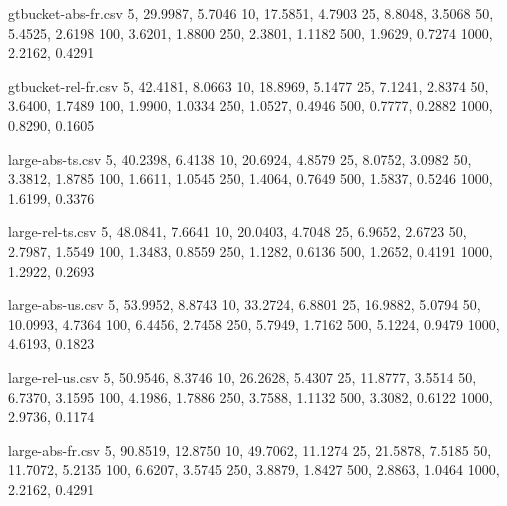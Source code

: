\begin{filecontents*}[overwrite]{gtbucket-abs-fr.csv}
5,    29.9987, 5.7046
10,   17.5851, 4.7903
25,    8.8048, 3.5068
50,    5.4525, 2.6198
100,   3.6201, 1.8800
250,   2.3801, 1.1182
500,   1.9629, 0.7274
1000,  2.2162, 0.4291
\end{filecontents*}

\begin{filecontents*}[overwrite]{gtbucket-rel-fr.csv}
5,    42.4181, 8.0663
10,   18.8969, 5.1477
25,    7.1241, 2.8374
50,    3.6400, 1.7489
100,   1.9900, 1.0334
250,   1.0527, 0.4946
500,   0.7777, 0.2882
1000,  0.8290, 0.1605
\end{filecontents*}


\begin{filecontents*}[overwrite]{large-abs-ts.csv}
5,    40.2398, 6.4138
10,   20.6924, 4.8579
25,    8.0752, 3.0982
50,    3.3812, 1.8785
100,   1.6611, 1.0545
250,   1.4064, 0.7649
500,   1.5837, 0.5246
1000,  1.6199, 0.3376
\end{filecontents*}

\begin{filecontents*}[overwrite]{large-rel-ts.csv}
5,    48.0841, 7.6641
10,   20.0403, 4.7048
25,    6.9652, 2.6723
50,    2.7987, 1.5549
100,   1.3483, 0.8559
250,   1.1282, 0.6136
500,   1.2652, 0.4191
1000,  1.2922, 0.2693
\end{filecontents*}

\begin{filecontents*}[overwrite]{large-abs-us.csv}
5,    53.9952, 8.8743
10,   33.2724, 6.8801
25,   16.9882, 5.0794
50,   10.0993, 4.7364
100,   6.4456, 2.7458
250,   5.7949, 1.7162
500,   5.1224, 0.9479
1000,  4.6193, 0.1823
\end{filecontents*}

\begin{filecontents*}[overwrite]{large-rel-us.csv}
5,    50.9546, 8.3746
10,   26.2628, 5.4307
25,   11.8777, 3.5514
50,    6.7370, 3.1595
100,   4.1986, 1.7886
250,   3.7588, 1.1132
500,   3.3082, 0.6122
1000,  2.9736, 0.1174
\end{filecontents*}

\begin{filecontents*}[overwrite]{large-abs-fr.csv}
5,    90.8519, 12.8750
10,   49.7062, 11.1274
25,   21.5878,  7.5185
50,   11.7072,  5.2135
100,   6.6207,  3.5745
250,   3.8879,  1.8427
500,   2.8863,  1.0464
1000,  2.2162,  0.4291
\end{filecontents*}

